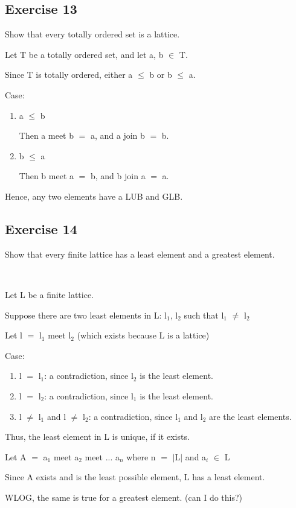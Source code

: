 \documentclass{article}
\newcommand{\mt}[1]{\ensuremath{#1}}
\newcommand\ssc[2][\DefaultOpt]{%
  \def\DefaultOpt{#2}%
  \subsection[#1]{#2}%
}
\newcommand{\elist}{\end{enumerate}}
\newcommand{\bilist}{\begin{enumerate}[label=\roman*)]}
\newcommand{\mem}{\mt{\in} }
\newcommand{\av}[1]{\mt{|}#1\mt{|}}  %
\newcommand{\lse}{\mt{\leq} }
\newcommand{\eql}{\mt{=} }
\newcommand{\uw}[2]{#1\mt{_{#2}}}
\begin{document}
\ssc{Exercise 13}{

Show that every totally ordered set is a lattice.

Let T be a totally ordered set, and let a, b \mem T.

Since T is totally ordered, either a \lse b or b \lse a.

Case:
\bilist
\item a \lse b

Then a meet b \eql a, and a join b \eql b.

\item b \lse a

Then b meet a \eql b, and b join a \eql a.

\elist

Hence, any two elements have a LUB and GLB.

}

\ssc{Exercise 14}{

Show that every finite lattice has a least element and a greatest element.

\

Let L be a finite lattice.

Suppose there are two least elements in L: \uw{l}{1}, \uw{l}{2} such that \uw{l}{1} $\neq$ \uw{l}{2}

Let l \eql \uw{l}{1} meet \uw{l}{2} (which exists because L is a lattice)

Case:

\bilist
\item l \eql \uw{l}{1}: a contradiction, since \uw{l}{2} is the least element.
\item l \eql \uw{l}{2}: a contradiction, since \uw{l}{1} is the least element.
\item l $\neq$ \uw{l}{1} and l $\neq$ \uw{l}{2}: a contradiction, since \uw{l}{1} and \uw{l}{2} are the least elements.
\elist

Thus, the least element in L is unique, if it exists.

Let A \eql \uw{a}{1} meet \uw{a}{2} meet ... \uw{a}{n} where n \eql \av{L} and \uw{a}{i} \mem L

Since A exists and is the least possible element, L has a least element.

WLOG, the same is true for a greatest element. (can I do this?)



}
\end{document}
